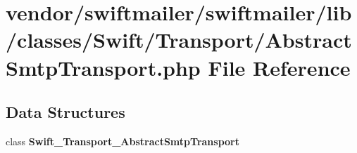 \section{vendor/swiftmailer/swiftmailer/lib/classes/\+Swift/\+Transport/\+Abstract\+Smtp\+Transport.php File Reference}
\label{_abstract_smtp_transport_8php}
\subsection*{Data Structures}
\begin{DoxyCompactItemize}
\item 
class {\bf Swift\+\_\+\+Transport\+\_\+\+Abstract\+Smtp\+Transport}
\end{DoxyCompactItemize}
